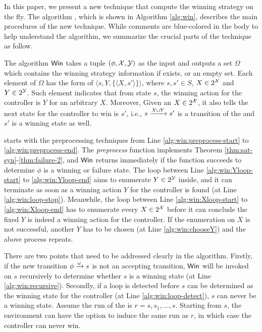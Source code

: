 In this paper, we present a new technique that compute the winning strategy on the fly. The algorithm \tool, which is shown in Algorithm \ref{alg:win}, describes the main procedures of the new technique. While comments are blue-colored in the body to help understand the algorithm, we summarize the crucial parts of the technique as follow.

The algorithm ${\sf Win}$ takes a tuple $(\phi, \mathcal{X}, \mathcal{Y})$ as the input and outputs a set $\Omega$ which contains the winning strategy information if exists, or an empty set. Each element of $\Omega$ has the form of $\langle s, Y, \{\langle X, s'\rangle\}\rangle$, where $s,s'\in S$, $X\in 2^{\mathcal{X}}$ and $Y\in 2^{\mathcal{Y}}$. Such element indicates that from state $s$, the winning action for the controller is $Y$ for an arbitrary $X$. Moreover, Given an $X\in 2^{\mathcal{X}}$, it also tells the next state for the controller to win is $s'$, i.e., $s\xrightarrow[]{X\cup Y}s'$ is a transition of the \tdfa and $s'$ is a winning state as well.

\tool starts with the preprocessing techniques from Line \ref{alg:win:preprocess-start} to \ref{alg:win:preprocess-end}. The \emph{preprocess} function implements Theorem \ref{thm:sat-syn}-\ref{thm:failure-2}, and ${\sf Win}$ returns immediately if the function succeeds to determine $\phi$ is a winning or failure state. The loop between Line \ref{alg:win:Yloop-start} to \ref{alg:win:Yloop-end} aims to enumerate $Y\in 2^{\mathcal{Y}}$ inside, and it can terminate as soon as a winning action $Y$ for the controller is found (at Line \ref{alg:win:loop-stop}). Meanwhile, the loop between Line \ref{alg:win:Xloop-start} to \ref{alg:win:Xloop-end} has to enumerate every $X\in 2^{\mathcal{X}}$ before it can conclude the fixed $Y$ is indeed a winning action for the controller. If the enumeration on $X$ is not successful, another $Y$ has to be chosen (at Line \ref{alg:win:chooseY}) and the above process repeats.

There are two points that need to be addressed clearly in the algorithm. Firstly, if the new transition $\phi\xrightarrow[]{\omega}s$ is not an accepting transition, ${\sf Win}$ will be invoked on $s$ recursively to determine whether $s$ is a winning state (at Line \ref{alg:win:recursive}). Secondly, if a loop is detected before $s$ can be determined as the winning state for the controller (at Line \ref{alg:win:loop-detect}), $s$ can never be a winning state. Assume the run of the \tdfa is $r=s,s_1,\ldots, s$. Starting from $s$, the environment can have the option to induce the same run as $r$, in which case the controller can never win.  


